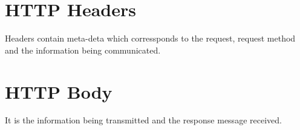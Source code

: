 \section{HTTP Headers}
Headers contain meta-deta which corressponds to the request, request method and the information being communicated. 
\section{HTTP Body}
It is the information being transmitted and the response message received.